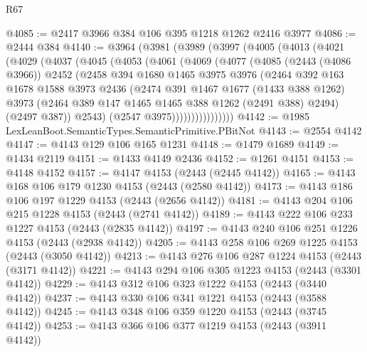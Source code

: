 \begin{lexlean}{R67}
\begin{coremodule}
@4085 := @2417 @3966 @384 @106 @395 @1218 @1262 @2416 @3977
@4086 := @2444 @384
@4140 := @3964
    (@3981
      (@3989
        (@3997
          (@4005
            (@4013
              (@4021
                (@4029
                  (@4037
                    (@4045
                      (@4053
                        (@4061
                          (@4069
                            (@4077
                              (@4085
                                (@2443 (@4086 @3966))
                                @2452
                                (@2458
                                  @394
                                  @1680
                                  @1465
                                  @3975
                                  @3976
                                  (@2464
                                    @392
                                    @163
                                    @1678
                                    @1588
                                    @3973
                                    @2436
                                    (@2474
                                      @391
                                      @1467
                                      @1677
                                      (@1433 @388 @1262)
                                      @3973
                                      (@2464 @389 @147 @1465 @1465 @388 @1262 (@2491 @388) @2494)
                                      (@2497 @387))
                                    @2543)
                                  (@2547 @3975))))))))))))))))
@4142 := @1985 LexLeanBoot.SemanticTypes.SemanticPrimitive.PBitNot
@4143 := @2554 @4142
@4147 := @4143 @129 @106 @165 @1231
@4148 := @1479 @1689
@4149 := @1434 @2119
@4151 := @1433 @4149 @2436
@4152 := @1261 @4151
@4153 := @4148 @4152
@4157 := @4147 @4153 (@2443 (@2445 @4142))
@4165 := @4143 @168 @106 @179 @1230 @4153 (@2443 (@2580 @4142))
@4173 := @4143 @186 @106 @197 @1229 @4153 (@2443 (@2656 @4142))
@4181 := @4143 @204 @106 @215 @1228 @4153 (@2443 (@2741 @4142))
@4189 := @4143 @222 @106 @233 @1227 @4153 (@2443 (@2835 @4142))
@4197 := @4143 @240 @106 @251 @1226 @4153 (@2443 (@2938 @4142))
@4205 := @4143 @258 @106 @269 @1225 @4153 (@2443 (@3050 @4142))
@4213 := @4143 @276 @106 @287 @1224 @4153 (@2443 (@3171 @4142))
@4221 := @4143 @294 @106 @305 @1223 @4153 (@2443 (@3301 @4142))
@4229 := @4143 @312 @106 @323 @1222 @4153 (@2443 (@3440 @4142))
@4237 := @4143 @330 @106 @341 @1221 @4153 (@2443 (@3588 @4142))
@4245 := @4143 @348 @106 @359 @1220 @4153 (@2443 (@3745 @4142))
@4253 := @4143 @366 @106 @377 @1219 @4153 (@2443 (@3911 @4142))

\end{coremodule}
\end{lexlean}
